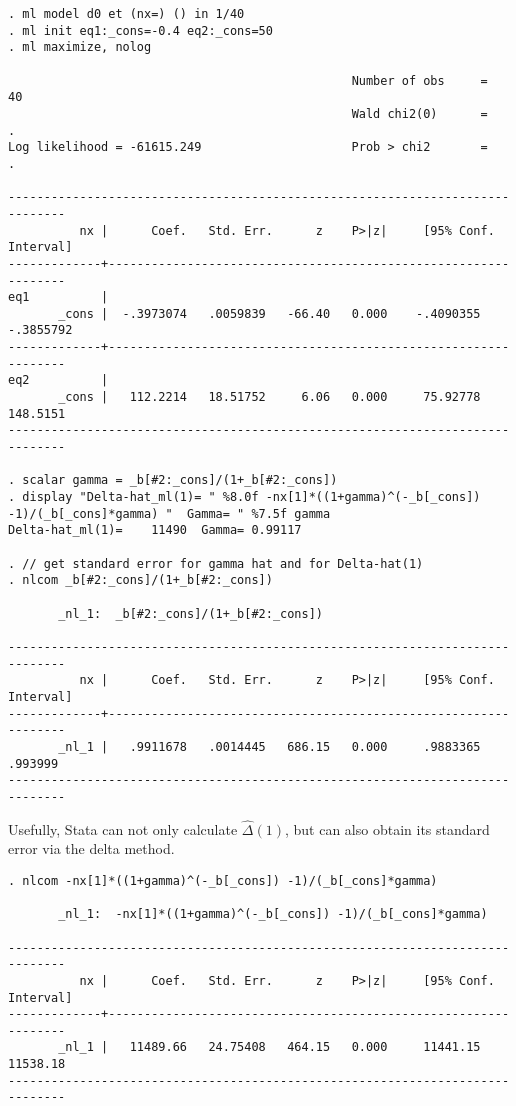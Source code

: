 {\obeylines\obeyspaces
\begin{verbatim}
. ml model d0 et (nx=) () in 1/40
. ml init eq1:_cons=-0.4 eq2:_cons=50
. ml maximize, nolog

                                                Number of obs     =         40
                                                Wald chi2(0)      =          .
Log likelihood = -61615.249                     Prob > chi2       =          .

------------------------------------------------------------------------------
          nx |      Coef.   Std. Err.      z    P>|z|     [95% Conf. Interval]
-------------+----------------------------------------------------------------
eq1          |
       _cons |  -.3973074   .0059839   -66.40   0.000    -.4090355   -.3855792
-------------+----------------------------------------------------------------
eq2          |
       _cons |   112.2214   18.51752     6.06   0.000     75.92778    148.5151
------------------------------------------------------------------------------

. scalar gamma = _b[#2:_cons]/(1+_b[#2:_cons])
. display "Delta-hat_ml(1)= " %8.0f -nx[1]*((1+gamma)^(-_b[_cons]) -1)/(_b[_cons]*gamma) "  Gamma= " %7.5f gamma
Delta-hat_ml(1)=    11490  Gamma= 0.99117

. // get standard error for gamma hat and for Delta-hat(1)
. nlcom _b[#2:_cons]/(1+_b[#2:_cons])

       _nl_1:  _b[#2:_cons]/(1+_b[#2:_cons])

------------------------------------------------------------------------------
          nx |      Coef.   Std. Err.      z    P>|z|     [95% Conf. Interval]
-------------+----------------------------------------------------------------
       _nl_1 |   .9911678   .0014445   686.15   0.000     .9883365     .993999
------------------------------------------------------------------------------
\end{verbatim}
\newpage
Usefully, Stata can not only calculate $\hat\Delta(1)$, but can also obtain its standard error via the delta method.

\begin{verbatim}
. nlcom -nx[1]*((1+gamma)^(-_b[_cons]) -1)/(_b[_cons]*gamma)

       _nl_1:  -nx[1]*((1+gamma)^(-_b[_cons]) -1)/(_b[_cons]*gamma)

------------------------------------------------------------------------------
          nx |      Coef.   Std. Err.      z    P>|z|     [95% Conf. Interval]
-------------+----------------------------------------------------------------
       _nl_1 |   11489.66   24.75408   464.15   0.000     11441.15    11538.18
------------------------------------------------------------------------------
\end{verbatim}
}

